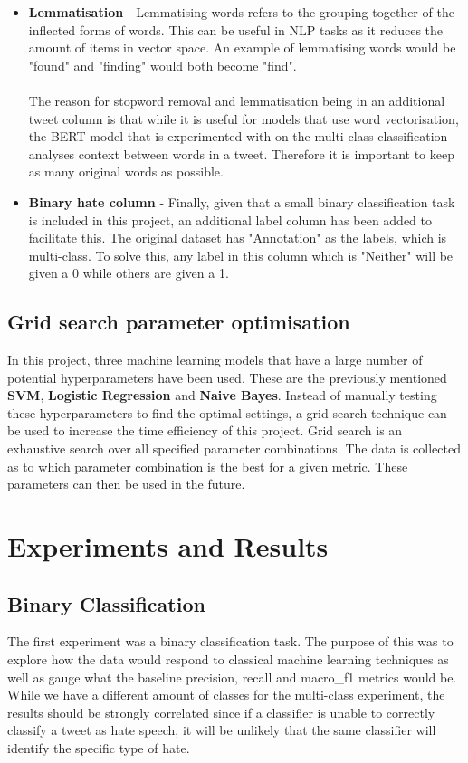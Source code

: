 \documentclass[conference]{IEEEtran}
\begin{document}
\begin{itemize}
  \item \textbf{Lemmatisation} - Lemmatising words refers to the grouping together of the inflected forms of words. This can be useful in NLP tasks as it reduces the amount of items in vector space. An example of lemmatising words would be "found" and "finding" would both become "find". 
  \\ \\
  The reason for stopword removal and lemmatisation being in an additional tweet column is that while it is useful for models that use word vectorisation, the BERT model that is experimented with on the multi-class classification analyses context between words in a tweet. Therefore it is important to keep as many original words as possible.
  
  \item \textbf{Binary hate column} - Finally, given that a small binary classification task is included in this project, an additional label column has been added to facilitate this. The original dataset has "Annotation" as the labels, which is multi-class. To solve this, any label in this column which is "Neither" will be given a 0 while others are given a 1.
\end{itemize}


\subsection{Grid search parameter optimisation}\label{AA}
In this project, three machine learning models that have a large number of potential hyperparameters have been used. These are the previously mentioned \textbf{SVM}, \textbf{Logistic Regression} and \textbf{Naive Bayes}. Instead of manually testing these hyperparameters to find the optimal settings, a grid search technique can be used to increase the time efficiency of this project.  Grid search is an exhaustive search over all specified parameter combinations. The data is collected as to which parameter combination is the best for a given metric. These parameters can then be used in the future.

\section{Experiments and Results}

\subsection{Binary Classification}
The first experiment was a binary classification task. The purpose of this was to explore how the data would respond to classical machine learning techniques as well as gauge what the baseline precision, recall and macro\_f1 metrics would be. While we have a different amount of classes for the multi-class experiment, the results should be strongly correlated since if a classifier is unable to correctly classify a tweet as hate speech, it will be unlikely that the same classifier will identify the specific type of hate.
\end{document}
